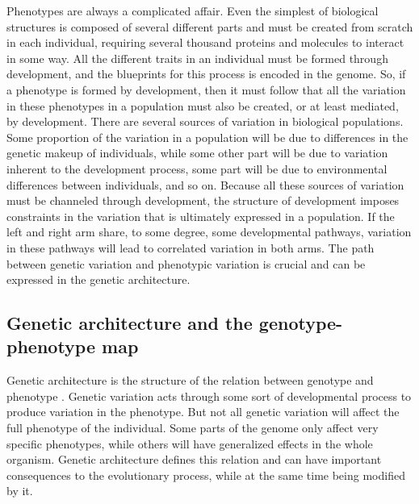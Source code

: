 \begin{refsection}
Phenotypes are always a complicated affair. Even the simplest of
biological structures is composed of several different parts and must be
created from scratch in each individual, requiring several thousand
proteins and molecules to interact in some way. All the different traits
in an individual must be formed through development, and the blueprints
for this process is encoded in the genome. So, if a phenotype is formed
by development, then it must follow that all the variation in these
phenotypes in a population must also be created, or at least mediated,
by development. There are several sources of variation in biological
populations. Some proportion of the variation in a population will be
due to differences in the genetic makeup of individuals, while some
other part will be due to variation inherent to the development process,
some part will be due to environmental differences between individuals,
and so on. Because all these sources of variation must be channeled
through development, the structure of development imposes constraints in
the variation that is ultimately expressed in a population. If the left
and right arm share, to some degree, some developmental pathways,
variation in these pathways will lead to correlated variation in both
arms. The path between genetic variation and phenotypic variation is
crucial and can be expressed in the genetic architecture.

\subsection{Genetic architecture and the genotype-phenotype
map}\label{genetic-architecture-and-the-genotype-phenotype-map}

Genetic architecture is
the structure of the relation between genotype and phenotype
\parencite{Hansen2006-ct}. Genetic variation acts through some sort of
developmental process to produce variation in the phenotype. But not all
genetic variation will affect the full phenotype of the individual. Some
parts of the genome only affect very specific phenotypes, while others
will have generalized effects in the whole organism. Genetic
architecture defines this relation and can have important consequences
to the evolutionary process, while at the same time being modified by
it.


\end{refsection}

